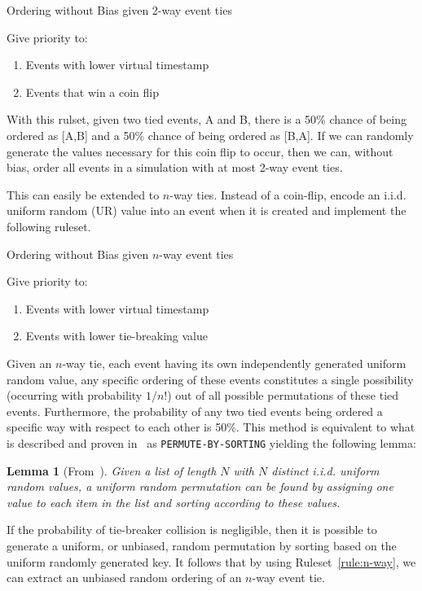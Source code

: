 \documentclass[nonacm,sigconf]{acmart}
\newtheorem{lemma}{Lemma}
\begin{document}
\begin{ruleset}
  \caption{Ordering without Bias given 2-way event ties}
\flushleft
Give priority to:
\begin{enumerate}
  \item Events with lower virtual timestamp
  \item Events that win a coin flip
\end{enumerate}
\end{ruleset}

With this rulset, given two tied events, A and B, there is a 50\% chance of being ordered as [A,B] and a 50\% chance of being ordered as [B,A]. If we can randomly generate the values necessary for this coin flip to occur, then we can, without bias, order all events in a simulation with at most 2-way event ties.

This can easily be extended to $n$-way ties. Instead of a coin-flip, encode an i.i.d. uniform random (UR) value into an event when it is created and implement the following ruleset.

\begin{ruleset}
  \caption{Ordering without Bias given $n$-way event ties} \label{rule:n-way}
\flushleft
Give priority to:
\begin{enumerate}
  \item Events with lower virtual timestamp
  \item Events with lower tie-breaking value
\end{enumerate}
\end{ruleset}

Given an $n$-way tie, each event having its own independently generated uniform random value, any specific ordering of these events constitutes a single possibility (occurring with probability $1/n!$) out of all possible permutations of these tied events. Furthermore, the probability of any two tied events being ordered a specific way with respect to each other is 50\%. This method is equivalent to what is described and proven in~\cite{cormen2001} as \texttt{PERMUTE-BY-SORTING} yielding the following lemma:

\begin{lemma}[From~\cite{cormen2001}]\label{lem:permutation}
  Given a list of length $N$ with $N$ distinct i.i.d. uniform random values, a uniform random permutation can be found by assigning one value to each item in the list and sorting according to these values.
\end{lemma}

If the probability of tie-breaker collision is negligible, then it is possible to generate a uniform, or unbiased, random permutation by sorting based on the uniform randomly generated key. It follows that by using Ruleset~\ref{rule:n-way}, we can extract an unbiased random ordering of an $n$-way event tie.
\end{document}
